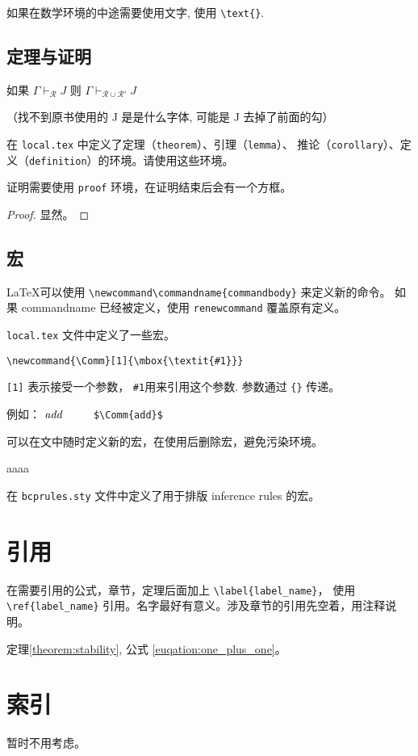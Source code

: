 \documentclass{ctexbook}
\begin{document}
如果在数学环境的中途需要使用文字, 使用 \verb!\text{}!.

\subsection{定理与证明}

\begin{theorem}[稳定性]\label{theorem:stability}
 如果 $\Gamma \vdash_{\mathcal{R}} J$ 则 $\Gamma \vdash_{\mathcal{R} \cup \mathcal{R}'} J$
\end{theorem}

（找不到原书使用的 J 是是什么字体, 可能是 J 去掉了前面的勾）

在 \texttt{local.tex} 中定义了定理（\texttt{theorem}）、引理（\texttt{lemma}）、
推论（\texttt{corollary}）、定义（\texttt{definition}）的环境。请使用这些环境。


证明需要使用 \texttt{proof} 环境，在证明结束后会有一个方框。
\begin{proof}
    显然。
\end{proof}


\subsection{宏}

\LaTeX 可以使用 \verb!\newcommand\commandname{commandbody}! 来定义新的命令。
如果 commandname 已经被定义，使用 \verb!renewcommand! 覆盖原有定义。

\texttt{local.tex} 文件中定义了一些宏。

\begin{verbatim}
\newcommand{\Comm}[1]{\mbox{\textit{#1}}}
\end{verbatim}

\texttt{[1]} 表示接受一个参数， \texttt{\#1}用来引用这个参数. 参数通过 \texttt{\{\}} 传递。

例如： $\Comm{add}$  $\qquad$ \vspace{1cm} \verb!$\Comm{add}$!

可以在文中随时定义新的宏，在使用后删除宏，避免污染环境。

\newcommand{\aaaa}{aaaa}
\aaaa
\let\aaaa\undefined

在 \texttt{bcprules.sty} 文件中定义了用于排版 inference rules 的宏。


\section{引用}

在需要引用的公式，章节，定理后面加上 \verb!\label{label_name}!， 使用 \verb!\ref{label_name}!
引用。名字最好有意义。涉及章节的引用先空着，用注释说明。

定理\ref{theorem:stability}, 公式 \ref{euqation:one_plus_one}。


\section{索引}

暂时不用考虑。
\end{document}
